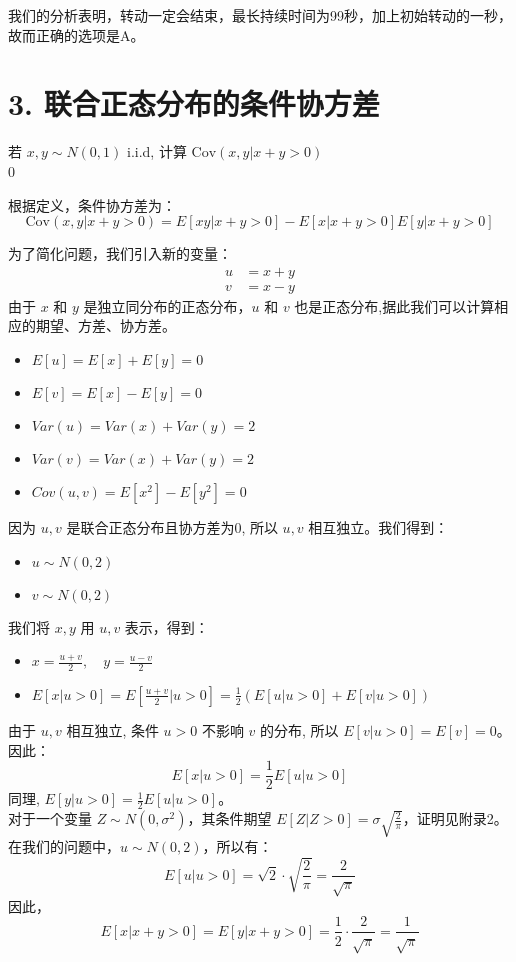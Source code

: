 \documentclass[UTF8]{ctexart}
\begin{document}
 我们的分析表明，转动一定会结束，最长持续时间为99秒，加上初始转动的一秒，故而正确的选项是A。



\section*{3. 联合正态分布的条件协方差}

若 $x, y \sim N(0,1)$ i.i.d, 计算 $\text{Cov}(x, y | x+y > 0)$
\\0

    根据定义，条件协方差为：
    \[
    \text{Cov}(x, y | x+y>0) = E[xy | x+y>0] - E[x | x+y>0]E[y | x+y>0]
    \]

    为了简化问题，我们引入新的变量：
    \begin{align*}
    u &= x + y \\
    v &= x - y
    \end{align*}
    由于 $x$ 和 $y$ 是独立同分布的正态分布，$u$ 和 $v$ 也是正态分布,据此我们可以计算相应的期望、方差、协方差。
    \begin{itemize}
        \item $E[u] = E[x] + E[y]  = 0$
        \item $E[v] = E[x] - E[y] = 0$
        \item $Var(u) = Var(x) + Var(y) = 2$
        \item $Var(v)  = Var(x) + Var(y) = 2$
        \item $Cov(u, v)  = E[x^2] - E[y^2] = 0$
    \end{itemize}

    因为 $u, v$ 是联合正态分布且协方差为0, 所以 $u, v$ 相互独立。我们得到：
    \begin{itemize}
    \item $u \sim N(0, 2)$ 
    \item $v \sim N(0, 2)$
    \end{itemize}

    我们将 $x, y$ 用 $u, v$ 表示，得到：
    \begin{itemize}
    \item $ x = \frac{u+v}{2}, \quad y = \frac{u-v}{2} $

    \item $E[x | u>0] = E\left[\frac{u+v}{2} \bigg| u>0\right] = \frac{1}{2} (E[u | u>0] + E[v | u>0])$ \\
    \end{itemize}
    由于 $u, v$ 相互独立, 条件 $u>0$ 不影响 $v$ 的分布, 所以 $E[v | u>0] = E[v] = 0$。因此：
    \[ E[x | u>0] = \frac{1}{2} E[u | u>0] \]
    同理, $E[y | u>0] = \frac{1}{2} E[u | u>0]$。\\
    对于一个变量 $Z \sim N(0, \sigma^2)$，其条件期望 $E[Z | Z>0] = \sigma \sqrt{\frac{2}{\pi}}$，证明见附录2。
    在我们的问题中，$u \sim N(0, 2)$，所以有：
    \[ E[u | u>0] = \sqrt{2} \cdot \sqrt{\frac{2}{\pi}} = \frac{2}{\sqrt{\pi}} \]
    因此，
    \[ E[x | x+y>0] = E[y | x+y>0] = \frac{1}{2} \cdot \frac{2}{\sqrt{\pi}} = \frac{1}{\sqrt{\pi}} \]
    
\end{document}
